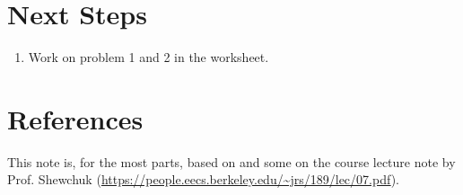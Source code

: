 \documentclass[letterpaper,12pt]{article}
\theoremstyle{plain}
\theoremstyle{definition}
\theoremstyle{remark}
\begin{document}
\section{Next Steps}

\begin{enumerate}
    \item Work on problem 1 and 2 in the worksheet.
\end{enumerate}

\section*{References}

This note is, for the most parts, based on \citet{hastie01statisticallearning} and some on the course lecture note by Prof. Shewchuk (\url{https://people.eecs.berkeley.edu/~jrs/189/lec/07.pdf}).




\newpage
\appendix
\onecolumn
\end{document}
